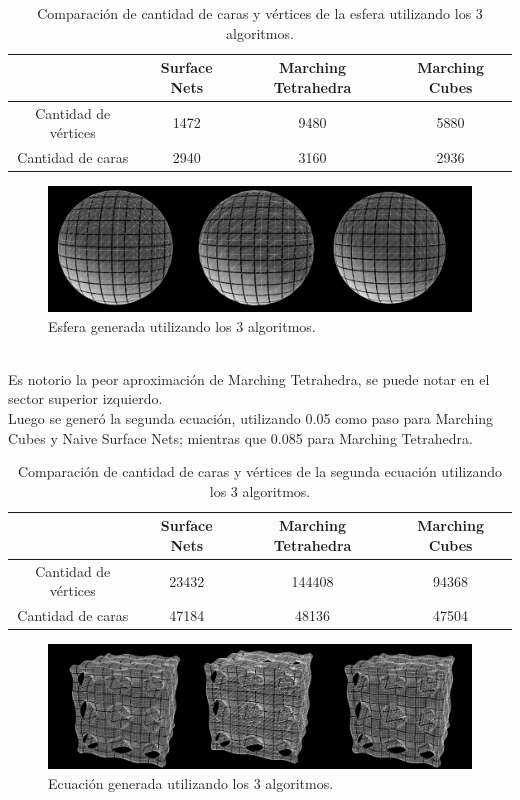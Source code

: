 \documentclass[12pt]{article}
\begin{document}
\begin{table}[h!]
  \centering
  \label{tab:table1}
  \begin{tabular}{cccc}
    \toprule
    & Surface Nets & Marching Tetrahedra & Marching Cubes\\
    \midrule
    Cantidad de vértices & 1472 & 9480  & 5880 \\
    Cantidad de caras &  2940 & 3160 & 2936 \\
    \bottomrule
  \end{tabular}
  \caption{Comparación de cantidad de caras y vértices de la esfera utilizando los 3 algoritmos.}
\end{table}
\begin{figure}[h!]
\includegraphics[width=\linewidth,center]{esfera2.png}
\caption{Esfera generada utilizando los 3 algoritmos.}
\end{figure}
\\Es notorio la peor aproximación de Marching Tetrahedra, se puede notar en el sector superior izquierdo.
\\Luego se generó la segunda ecuación, utilizando 0.05 como paso para Marching Cubes y Naive Surface Nets; mientras que 0.085 para Marching Tetrahedra.
\begin{table}[h!]
  \centering
  \label{tab:table1}
  \begin{tabular}{cccc}
    \toprule
    & Surface Nets & Marching Tetrahedra & Marching Cubes\\
    \midrule
    Cantidad de vértices & 23432 & 144408  & 94368 \\
    Cantidad de caras &  47184 & 48136 & 47504 \\
    \bottomrule
  \end{tabular}
  \caption{Comparación de cantidad de caras y vértices de la segunda ecuación utilizando los 3 algoritmos.}
\end{table}
\clearpage
\begin{figure}[h!]
\includegraphics[width=\linewidth,center]{ecuacion2.png}
\caption{Ecuación generada utilizando los 3 algoritmos.}
\end{figure}
\end{document}
